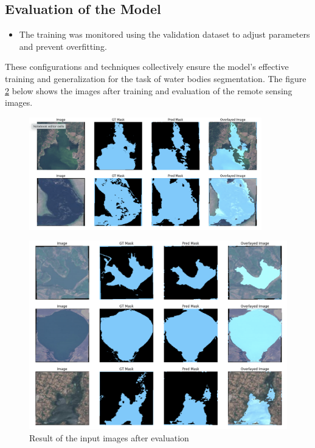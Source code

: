 \subsection{Evaluation of the Model}

\begin{itemize}
   
        \item The training was monitored using the validation dataset to adjust parameters and prevent overfitting.
        
    \end{itemize}
    These configurations and techniques collectively ensure the model's effective training and generalization for the task of water bodies segmentation. The figure \ref{predict2} below shows the images after training and evaluation of the remote sensing images.


\begin{figure}[H]
\centering
\includegraphics[width=0.9\textwidth]{figs/predict.png}
\label{predict1}
\end{figure}

\begin{figure}[H]
\centering
\includegraphics[width=1\textwidth]{figs/evaluation.png}
\caption{Result of the input images after evaluation}
\label{predict2}
\end{figure}



